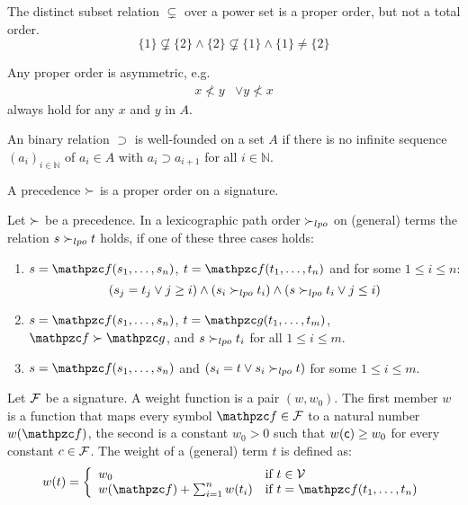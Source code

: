 \begin{example}The distinct subset relation $\subsetneq$ over a power set is a proper order, but not a total order.
	\[
		\{ 1 \} \not\subsetneq \{ 2 \}
		\land \{ 2 \} \not\subsetneq \{ 1 \}
		\land 	\{ 1 \} \neq \{ 2 \}
	\]
	\end{example}

\begin{lemma}
	Any proper order is asymmetric, e.g.
	\begin{align*}
		x\not<y &\lor y\not<x \tag*{asymmetry}
	\end{align*}
always hold for any $x$ and $y$ in $A$.
	\end{lemma}

\begin{definition}
	An binary relation $\supset$ is {\myem well-founded} on a set $A$ if there is no infinite sequence 
	$(a_i)_{i\in\mathbb{N}}$ of $a_i\in A$
	with $a_i\supset a_{i+1}$ for all $i\in\mathbb{N}$.
\end{definition}

\begin{definition}\label{def:prec}
	A {\myem precedence} $\succ$ is a proper order 
	on a signature.
\end{definition}

\begin{definition}[LPO]\label{def:lpo}
	Let $\succ$ be a precedence. In a {\myem lexicographic path order} $\succ_{lpo}$ on (general) terms the relation $s\succ_{lpo} t$ holds,
	if one of these three cases holds:
	\begin{enumerate}
		\item $s=\mcf(s_1,\ldots,s_n)$, $t=\mcf(t_1,\ldots,t_n)$ and for some $1\leq i\leq n$:
		\[
		(s_j=t_j\lor j\geq i) \land (s_i\succ_{lpo} t_i) \land (s\succ_{lpo} t_i \lor j\leq i)
		\]
		\item $s=\mcf(s_1,\ldots,s_n)$, $t=\mcg(t_1,\ldots,t_m)$, $\mcf\gtpre\mcg$, and $s\succ_{lpo} t_i$ for all $1\leq i\leq m$.
		\item $s=\mcf(s_1,\ldots,s_n)$ and $(s_i=t \lor s_i\succ_{lpo} t)$ for some $1\leq i\leq m$.
	\end{enumerate}
\end{definition}

\begin{definition}\label{def:weight}
	Let ${\mathcal F}$ be a signature.
	A {\myem weight function} is a pair $(w,w_0)$. 
	The first member $w$ is a function that maps every symbol $\mcf\in\mcF$ to a natural number $w(\mcf)$,
	the second is a constant $w_0>0$ such that $w({\mathsf c})\geq w_0$ for every constant $c\in{\mathcal F}$. 
	The weight of a (general) term $t$ is defined as:
	\begin{gather*}
	w(t) = \left\{ \begin{array}{ll} 
	w_0 & \text{if } t\in\mcV\\
	w(\mcf)+\sum_{i=1}^n w(t_i) & \text{if }t=\mcf(t_1,\ldots,t_n)
	\end{array}\right.
	\end{gather*}
\end{definition}

